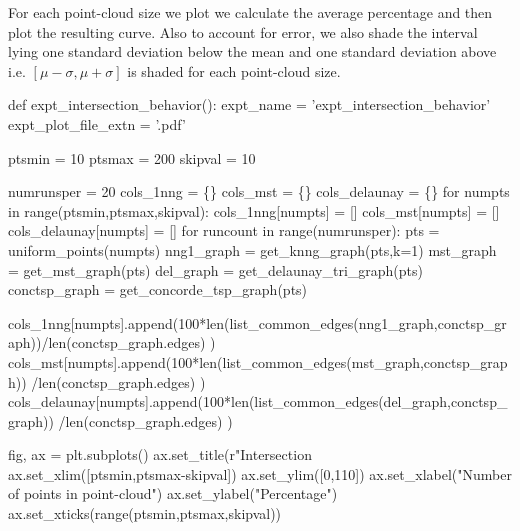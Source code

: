 For each point-cloud size we plot we calculate the average percentage and then plot the resulting 
curve. Also to account for error, we also shade the interval lying one standard deviation below the mean 
and one standard deviation above i.e. $[\mu-\sigma, \mu+\sigma]$ is shaded for each point-cloud size. 




\nwenddocs{}\endmoddef\nwstartdeflinemarkup{}\nwenddeflinemarkup
def expt_intersection_behavior():
     expt_name           = 'expt_intersection_behavior'
     expt_plot_file_extn = '.pdf'

     ptsmin   = 10
     ptsmax   = 200
     skipval  = 10

     numrunsper    = 20
     cols_1nng     = \{\}
     cols_mst      = \{\}
     cols_delaunay = \{\}
     for numpts in range(ptsmin,ptsmax,skipval):
          cols_1nng[numpts]     = []
          cols_mst[numpts]      = []
          cols_delaunay[numpts] = []
          for runcount in range(numrunsper):
               pts           = uniform_points(numpts)
               nng1_graph    = get_knng_graph(pts,k=1)
               mst_graph     = get_mst_graph(pts)
               del_graph     = get_delaunay_tri_graph(pts)
               conctsp_graph = get_concorde_tsp_graph(pts)
               
               cols_1nng[numpts].append(100*len(list_common_edges(nng1_graph,conctsp_graph))/len(conctsp_graph.edges) )
               cols_mst[numpts].append(100*len(list_common_edges(mst_graph,conctsp_graph)) /len(conctsp_graph.edges) )
               cols_delaunay[numpts].append(100*len(list_common_edges(del_graph,conctsp_graph)) /len(conctsp_graph.edges) )

     fig, ax = plt.subplots()
     ax.set_title(r"Intersection \\%
     ax.set_xlim([ptsmin,ptsmax-skipval])
     ax.set_ylim([0,110])
     ax.set_xlabel("Number of points in point-cloud")
     ax.set_ylabel("Percentage")
     ax.set_xticks(range(ptsmin,ptsmax,skipval))
     
